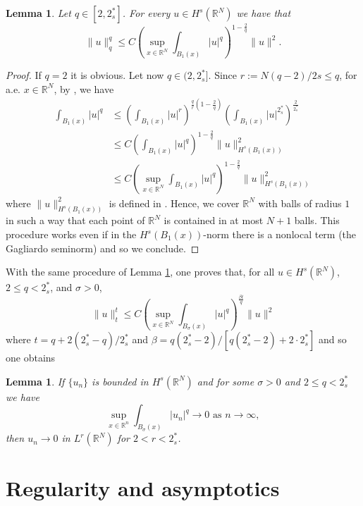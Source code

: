 \documentclass[10pt]{amsart}
\numberwithin{equation}{section}
\newtheorem{lemma}[theorem]{Lemma}
\begin{document}
\begin{lemma}
\label{lemmacc}
Let $q\in[2,2^*_s]$. For every $u\in H^s(\mathbb{R}^N)$ we have that
\begin{equation*}
\|u\|_q^q \leq
C \left(\sup_{x\in\mathbb{R}^N} \int_{B_1(x)} |u|^q\right)^{1-\frac{2}{q}} \|u\|^2.
\end{equation*}
\end{lemma}
\begin{proof}
If $q=2$ it is obvious.
Let now $q\in(2,2^*_s]$. Since $r:=N(q-2)/2s\leq q$, 
for a.e. $x\in\mathbb{R}^N$, by \cite[Theorem 6.7]{DPV}, we have
\begin{align*}
\int_{B_1(x)} |u|^q
& \leq
\left(\int_{B_1(x)} |u|^r\right)^{\frac{q}{r}\left(1-\frac{2}{q}\right)}
\left(\int_{B_1(x)} |u|^{2^*_s}\right)^\frac{2}{2^*_s}\\
& \leq
C\left(\int_{B_1(x)} |u|^q\right)^{1-\frac{2}{q}}
\|u\|_{H^s(B_1(x))}^2\\
& \leq
C \left(\sup_{x\in\mathbb{R}^N} \int_{B_1(x)} |u|^q\right)^{1-\frac{2}{q}} \|u\|_{H^s(B_1(x))}^2
\end{align*}
where $\|u\|_{H^s(B_1(x))}^2$ is defined in \cite[Equation (2.2)]{DPV}. Hence, we cover $\mathbb{R}^N$ with balls of radius $1$ in such a way that each point of $\mathbb{R}^N$ is contained in at most $N+1$ balls. This procedure works even if in the $H^s(B_1(x))$-norm there is a nonlocal term (the Gagliardo seminorm) and so we conclude.
\end{proof}

\noindent
With the same procedure of Lemma \ref{lemmacc}, one proves that, for all $u\in H^s(\mathbb{R}^N)$, $2\leq q < 2_{s}^{*}$, and $\sigma>0$,
\[
\|u\|_t^t
\leq
C\left(\sup_{x\in\mathbb{R}^N} \int_{B_\sigma(x)} |u|^q\right)^{\frac{\beta t}{q}} \|u\|^2
\]
where $t=q+2(2^*_s-q)/2^*_s$ and $\beta=q(2^*_s-2)/[q(2^*_s-2)+2\cdot 2^*_s]$ and so one obtains
\begin{lemma}
\label{lionslemma}
If $\{u_{n}\}$ is bounded in $H^{s}(\mathbb R^{N})$ and for some $\sigma>0$ and $2\leq q < 2_{s}^{*}$ we have
$$\sup_{x\in \mathbb R^{n}}\int_{B_\sigma(x)}|u_{n}|^{q}\to 0 \text{ as } n\to \infty,$$
then $u_{n}\to 0$ in $L^{r}(\mathbb R^{N})$ for $2< r <2_{s}^{*}$.
\end{lemma}

 
 
 
\section{Regularity and asymptotics}\label{sec:reg}
\end{document}
